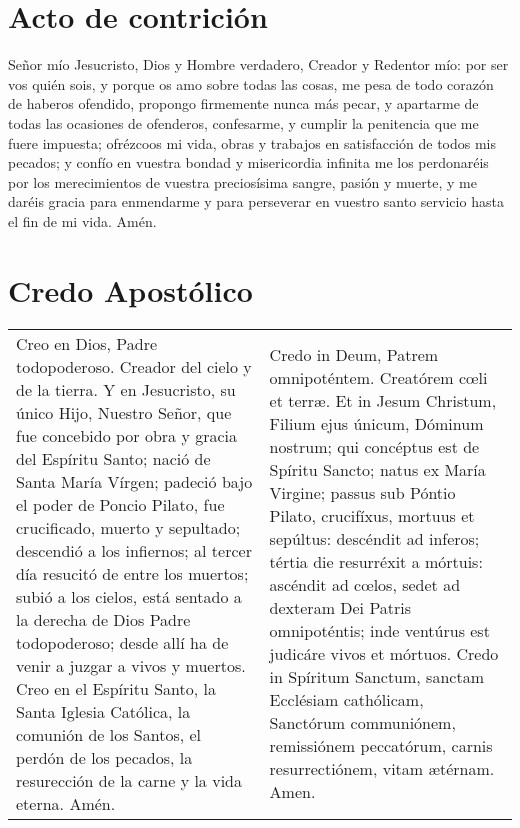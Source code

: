 \documentclass[11pt,a4paper]{book}
\begin{document}
    \section*{Acto de contrición}\label{sec:contricion}
    Señor mío Jesucristo, Dios y Hombre verdadero, Creador y Redentor mío: por ser vos quién sois, y porque os amo sobre todas las cosas, 
    me pesa de todo corazón de haberos ofendido, propongo firmemente nunca más pecar, y apartarme de todas las ocasiones de ofenderos, 
    confesarme, y cumplir la penitencia que me fuere impuesta; ofrézcoos mi vida, obras y trabajos en satisfacción de todos mis pecados; 
    y confío en vuestra bondad y misericordia infinita me los perdonaréis por los merecimientos de vuestra preciosísima sangre, pasión y muerte, 
    y me daréis gracia para enmendarme y para perseverar en vuestro santo servicio hasta el fin de mi vida. Amén.

    \section*{Credo Apostólico}\label{sec:credo}
    \begin{longtable} { p{} p{} }
        Creo en Dios, Padre todopoderoso. Creador del cielo y de la tierra. Y en Jesucristo, su único Hijo, Nuestro Señor, 
        que fue concebido por obra y gracia del Espíritu Santo; nació de Santa María Vírgen; padeció bajo el poder de Poncio Pilato, 
        fue crucificado, muerto y sepultado; descendió a los infiernos; al tercer día resucitó de entre los muertos; subió a los cielos, 
        está sentado a la derecha de Dios Padre todopoderoso; desde allí ha de venir a juzgar a vivos y muertos. 
        Creo en el Espíritu Santo, la Santa Iglesia Católica, la comunión de los Santos, el perdón de los pecados, 
        la resurección de la carne y la vida eterna. Amén. 
        &
        Credo in Deum, Patrem omnipoténtem. Creatórem cœli et terræ. Et in Jesum Christum, Filium ejus únicum, Dóminum nostrum; 
        qui concéptus est de Spíritu Sancto; natus ex María Virgine; passus sub Póntio Pilato, crucifíxus, mortuus et sepúltus: 
        descéndit ad inferos; tértia die resurréxit a mórtuis: ascéndit ad cœlos, sedet ad dexteram Dei Patris omnipoténtis; 
        inde ventúrus est judicáre vivos et mórtuos. Credo in Spíritum Sanctum, sanctam Ecclésiam cathólicam, Sanctórum communiónem, 
        remissiónem peccatórum, carnis resurrectiónem, vitam ætérnam. Amen.
    \end{longtable}
\end{document}
